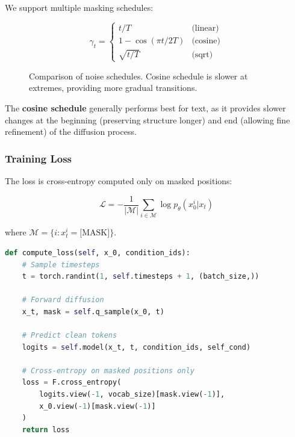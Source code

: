 \documentclass[11pt,a4paper]{article}
\begin{document}
We support multiple masking schedules:

\begin{equation}
    \gamma_t = \begin{cases}
        t/T & \text{(linear)} \\
        1 - \cos(\pi t / 2T) & \text{(cosine)} \\
        \sqrt{t/T} & \text{(sqrt)}
    \end{cases}
\end{equation}

\begin{figure}[H]
\centering
{}
\caption{Comparison of noise schedules. Cosine schedule is slower at extremes, providing more gradual transitions.}
\label{fig:schedules}
\end{figure}

\begin{keyinsight}
The \textbf{cosine schedule} generally performs best for text, as it provides slower changes at the beginning (preserving structure longer) and end (allowing fine refinement) of the diffusion process.
\end{keyinsight}

\subsubsection{Training Loss}

The loss is cross-entropy computed only on masked positions:

\begin{equation}
    \mathcal{L} = -\frac{1}{|\mathcal{M}|} \sum_{i \in \mathcal{M}} \log p_\theta(x_0^i | x_t)
\end{equation}

where $\mathcal{M} = \{i : x_t^i = \text{[MASK]}\}$.

\begin{lstlisting}[language=Python]
def compute_loss(self, x_0, condition_ids):
    # Sample timesteps
    t = torch.randint(1, self.timesteps + 1, (batch_size,))
    
    # Forward diffusion
    x_t, mask = self.q_sample(x_0, t)
    
    # Predict clean tokens
    logits = self.model(x_t, t, condition_ids, self_cond)
    
    # Cross-entropy on masked positions only
    loss = F.cross_entropy(
        logits.view(-1, vocab_size)[mask.view(-1)],
        x_0.view(-1)[mask.view(-1)]
    )
    return loss
\end{lstlisting}
\end{document}
